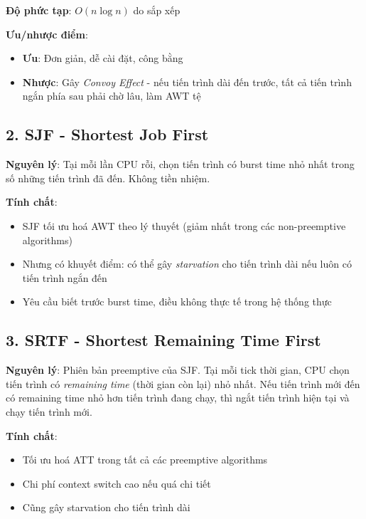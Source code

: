 \textbf{Độ phức tạp}: $O(n \log n)$ do sắp xếp

\textbf{Ưu/nhược điểm}:
\begin{itemize}[leftmargin=1.5cm]
  \item \textbf{Ưu}: Đơn giản, dễ cài đặt, công bằng
  \item \textbf{Nhược}: Gây \textit{Convoy Effect} - nếu tiến trình dài đến trước, 
  tất cả tiến trình ngắn phía sau phải chờ lâu, làm AWT tệ
\end{itemize}

\subsection{2. SJF - Shortest Job First}

\textbf{Nguyên lý}: Tại mỗi lần CPU rỗi, chọn tiến trình có burst time nhỏ nhất 
trong số những tiến trình đã đến. Không tiền nhiệm.

\textbf{Tính chất}:
\begin{itemize}[leftmargin=1.5cm]
  \item SJF tối ưu hoá AWT theo lý thuyết (giảm nhất trong các non-preemptive algorithms)
  \item Nhưng có khuyết điểm: có thể gây \textit{starvation} cho tiến trình dài nếu luôn có tiến trình ngắn đến
  \item Yêu cầu biết trước burst time, điều không thực tế trong hệ thống thực
\end{itemize}

\subsection{3. SRTF - Shortest Remaining Time First}

\textbf{Nguyên lý}: Phiên bản preemptive của SJF. Tại mỗi tick thời gian, 
CPU chọn tiến trình có \textit{remaining time} (thời gian còn lại) nhỏ nhất. 
Nếu tiến trình mới đến có remaining time nhỏ hơn tiến trình đang chạy, 
thì ngắt tiến trình hiện tại và chạy tiến trình mới.

\textbf{Tính chất}:
\begin{itemize}[leftmargin=1.5cm]
  \item Tối ưu hoá ATT trong tất cả các preemptive algorithms
  \item Chi phí context switch cao nếu quá chi tiết
  \item Cũng gây starvation cho tiến trình dài
\end{itemize}

